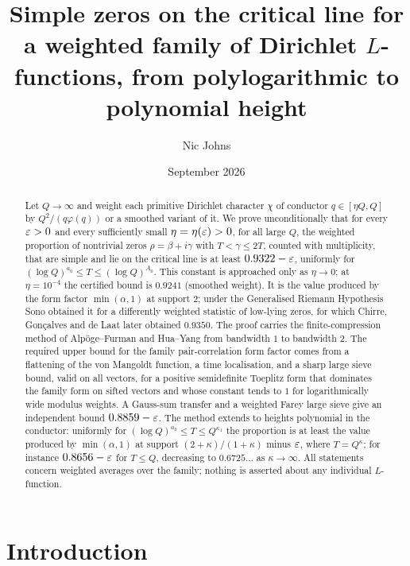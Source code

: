 \documentclass[11pt]{amsart}
\title[Simple critical zeros of Dirichlet $L$-functions on average]{Simple zeros on the critical line for a weighted family of Dirichlet $L$-functions, from polylogarithmic to polynomial height}
\author{Nic Johns}
\date{September 2026}
\theoremstyle{definition}
\theoremstyle{remark}
\numberwithin{equation}{section}
\begin{document}
\begin{abstract}
Let $Q\to\infty$ and weight each primitive Dirichlet character $\chi$ of conductor $q\in[\eta Q,Q]$ by $Q^2/(q\varphi(q))$ or a smoothed variant of it.
We prove unconditionally that for every $\varepsilon>0$ and every sufficiently small $\eta=\eta(\varepsilon)>0$, for all large $Q$, the weighted proportion of nontrivial zeros $\rho=\beta+i\gamma$ with $T<\gamma\le2T$, counted with multiplicity, that are simple and lie on the critical line is at least $0.9322-\varepsilon$, uniformly for $(\log Q)^{a_0}\le T\le(\log Q)^{A_0}$.
This constant is approached only as $\eta\to0$; at $\eta=10^{-4}$ the certified bound is $0.9241$ (smoothed weight).
It is the value produced by the form factor $\min(\alpha,1)$ at support $2$; under the Generalised Riemann Hypothesis Sono obtained it for a differently weighted statistic of low-lying zeros, for which Chirre, Gon\c calves and de Laat later obtained $0.9350$.
The proof carries the finite-compression method of Alp\"oge--Furman and Hua--Yang from bandwidth $1$ to bandwidth $2$.
The required upper bound for the family pair-correlation form factor comes from a flattening of the von Mangoldt function, a time localisation, and a sharp large sieve bound, valid on all vectors, for a positive semidefinite Toeplitz form that dominates the family form on sifted vectors and whose constant tends to $1$ for logarithmically wide modulus weights.
A Gauss-sum transfer and a weighted Farey large sieve give an independent bound $0.8859-\varepsilon$.
The method extends to heights polynomial in the conductor: uniformly for $(\log Q)^{a_0}\le T\le Q^{\kappa_1}$ the proportion is at least the value produced by $\min(\alpha,1)$ at support $(2+\kappa)/(1+\kappa)$ minus $\varepsilon$, where $T=Q^\kappa$; for instance $0.8656-\varepsilon$ for $T\le Q$, decreasing to $0.6725\ldots$ as $\kappa\to\infty$.
All statements concern weighted averages over the family; nothing is asserted about any individual $L$-function.
\end{abstract}

\maketitle

\setcounter{tocdepth}{1}
\tableofcontents

\section{Introduction}\label{sec:intro}
\end{document}
